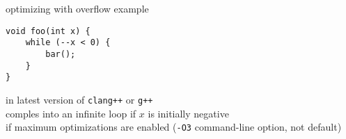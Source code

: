 \begin{frame}[fragile,label=optWithOFlow]{optimizing with overflow example}
\lstset{language=C++,style=small}
\begin{lstlisting}
void foo(int x) {
    while (--x < 0) {
        bar();
    }
}
\end{lstlisting}
in latest version of {\tt clang++} or {\tt g++}  \\
comples into an infinite loop if $x$ is initially negative\\
if maximum optimizations are enabled ({\tt -O3} command-line option, not default) \\
\end{frame}
